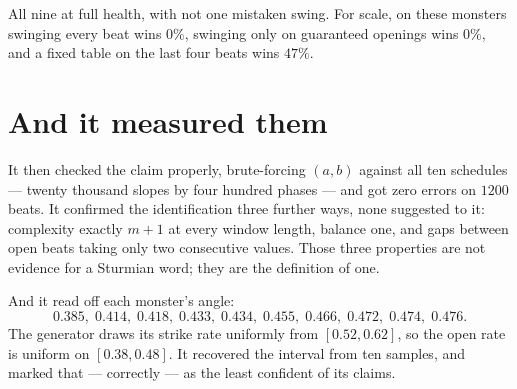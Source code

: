 \documentclass[11pt,a4paper]{article}
\begin{document}
All nine at full health, with not one mistaken swing. For scale, on these
monsters swinging every beat wins $0\%$, swinging only on guaranteed openings
wins $0\%$, and a fixed table on the last four beats wins $47\%$.

\section{And it measured them}

It then checked the claim properly, brute-forcing $(a,b)$ against all ten
schedules --- twenty thousand slopes by four hundred phases --- and got zero
errors on $1200$ beats. It confirmed the identification three further ways, none
suggested to it: complexity exactly $m+1$ at every window length, balance one,
and gaps between open beats taking only two consecutive values. Those three
properties are not evidence for a Sturmian word; they are the definition of one.

And it read off each monster's angle:
\[
  0.385,\; 0.414,\; 0.418,\; 0.433,\; 0.434,\; 0.455,\; 0.466,\; 0.472,\;
  0.474,\; 0.476 .
\]
The generator draws its strike rate uniformly from $[0.52, 0.62]$, so the open
rate is uniform on $[0.38, 0.48]$. It recovered the interval from ten samples,
and marked that --- correctly --- as the least confident of its claims.
\end{document}
